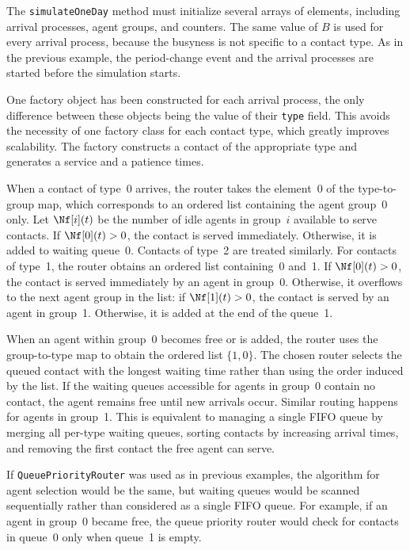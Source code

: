 The \texttt{simulate\-One\-Day} method must initialize several arrays
of elements, including arrival processes, agent groups, and counters.
The same value of $B$ is used for every arrival process, because the
busyness is not specific to a contact type.
As in the previous example, the period-change event and the
arrival processes are started before the simulation starts.

One factory object has been constructed for each arrival
process, the only difference between these objects being the value of
their \texttt{type} field.  This
avoids the necessity of one factory class for each contact type,
which greatly improves scalability.
The factory constructs a contact of the
appropriate type and generates a service and a patience times.

When a contact of type~0 arrives, the router takes the element~0 of
the type-to-group map, which corresponds to an ordered list containing
the
agent group~0 only.  Let $\Nf[i](t)$ be the number of idle agents in
group~$i$ available to serve contacts.
If $\Nf[0](t)>0$, the contact is served
immediately.  Otherwise, it is added to waiting queue~0.  Contacts of
type~2 are treated similarly.  For contacts of type~1, the router
obtains an ordered list containing~0 and~1.  If $\Nf[0](t)>0$, the contact
is served immediately by an agent in group~0.  Otherwise, it overflows
to the next agent
group in the list:  if $\Nf[1](t)>0$, the contact is served by an
agent in group~1.
Otherwise, it is added at the end of the queue~1.

When an agent within group~0 becomes free or is added, the router uses
the group-to-type map to obtain the ordered list $\{1, 0\}$.  The
chosen
router selects the queued contact with the longest waiting time rather
than using the order induced by the list.  If the waiting queues
accessible for agents in group~0 contain no contact, the agent
remains free until new arrivals occur.  Similar routing
happens for agents in group~1.  This is equivalent to managing a
single FIFO queue by merging all
per-type waiting queues, sorting contacts by increasing arrival
times, and removing the first contact the free agent can serve.

If \texttt{Queue\-Priority\-Router} was used as in previous examples,
the algorithm for agent selection would be the same, but waiting
queues would be scanned sequentially rather than considered as a
single FIFO queue.  For example, if an agent in
group~0 became free, the queue priority router would check for
contacts in queue~0 only when queue~1 is empty.

